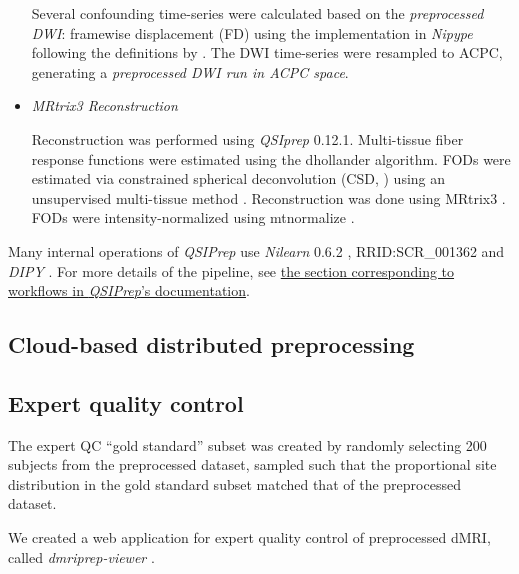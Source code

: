 \documentclass[fleqn,10pt]{wlscirep}
\begin{document}
\begin{itemize}
Several confounding time-series were calculated based on the
\emph{preprocessed DWI}: framewise displacement (FD) using the implementation
in \emph{Nipype} following the definitions by \cite{power_fd_dvars}. The DWI
time-series were resampled to ACPC, generating a \emph{preprocessed DWI run
in ACPC space}.

\item {\it MRtrix3 Reconstruction}

Reconstruction was performed using \emph{QSIprep} 0.12.1. Multi-tissue fiber response functions were estimated using the dhollander algorithm. FODs were estimated via constrained spherical deconvolution (CSD, \cite{originalcsd, tournier2008csd}) using an unsupervised multi-tissue method \cite{dhollander2019response, dhollander2016unsupervised}. Reconstruction was done using MRtrix3 \cite{mrtrix3}. FODs were intensity-normalized using mtnormalize \cite{mtnormalize}.

\end{itemize}

Many internal operations of \emph{QSIPrep} use \emph{Nilearn} 0.6.2 \cite{nilearn}, RRID:SCR\_001362 and \emph{DIPY} \cite{dipy}. For more details of the pipeline, see \href{https://qsiprep.readthedocs.io/en/latest/workflows.html}{the section corresponding to workflows in \emph{QSIPrep}'s documentation}.

\subsection*{Cloud-based distributed preprocessing}


\subsection*{Expert quality control}

The expert QC ``gold standard'' subset was created by randomly selecting 200 subjects from the preprocessed dataset, sampled such that the proportional site distribution in the gold standard subset matched that of the preprocessed dataset.

We created a web application for expert quality control of preprocessed dMRI, called \emph{dmriprep-viewer} \cite{richie-halford2021-dmriprep-viewer}.

\end{document}
